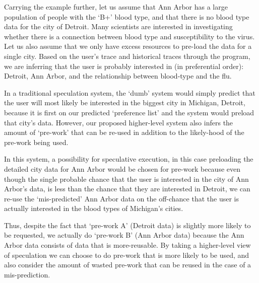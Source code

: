 Carrying the example further, let us assume that Ann Arbor has a large
population of people with the `B+' blood type, and that there is no blood type
data for the city of Detroit. Many scientists are interested in investigating
whether there is a connection between blood type and susceptibility to the
virus. Let us also assume that we only have excess resources to pre-load the
data for a single city. Based on the user's trace and historical traces through
the program, we are inferring that the user is probably interested in (in
preferential order): Detroit, Ann Arbor, and the relationship between blood-type
and the flu. 

In a traditional speculation system, the `dumb' system would simply predict that
the user will most likely be interested in the biggest city in Michigan,
Detroit, because it is first on our predicted `preference list' and the system
would preload that city's data. However, our proposed higher-level system also
infers the amount of `pre-work' that can be re-used in addition to the
likely-hood of the pre-work being used. 

In this system, a possibility for speculative execution, in this case preloading
the detailed city data for Ann Arbor would be chosen for pre-work because even
though the single probable chance that the user is interested in the city of Ann
Arbor's data, is less than the chance that they are interested in Detroit, we
can re-use the `mis-predicted' Ann Arbor data on the off-chance that the user is
actually interested in the blood types of Michigan's cities. 

Thus, despite the fact that `pre-work A' (Detroit data) is slightly more likely
to be requested, we actually do `pre-work B' (Ann Arbor data) because the Ann
Arbor data consists of data that is more-reusable. By taking a higher-level view
of speculation we can choose to do pre-work that is more likely to be used, and
also consider the amount of wasted pre-work that can be reused in the case of a
mis-prediction.


